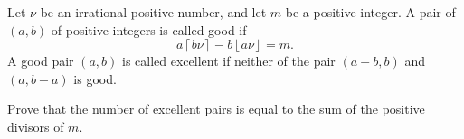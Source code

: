 Let 
$\nu$
 be an irrational positive number, and let 
$m$
 be a positive integer. A pair of 
$(a,b)$
 of positive integers is called 
good
 if
\[a \left \lceil b\nu \right \rceil - b \left \lfloor a \nu \right \rfloor = m.\]
 A good pair 
$(a,b)$
 is called 
excellent
 if neither of the pair 
$(a-b,b)$
 and 
$(a,b-a)$
 is good.


Prove that the number of excellent pairs is equal to the sum of the positive divisors of 
$m$.
